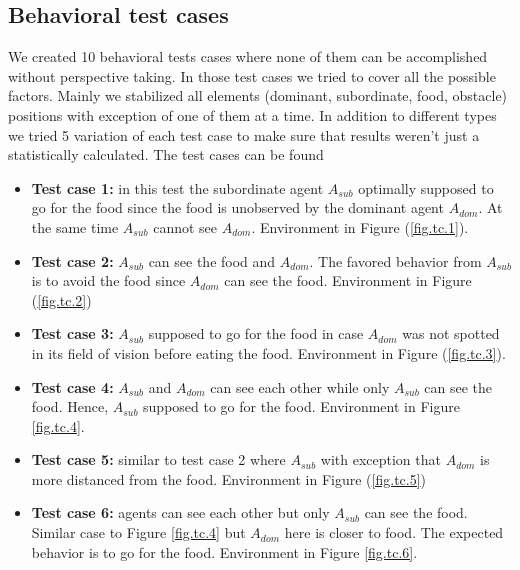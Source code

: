 \documentclass{article}
\begin{document}
\subsection{Behavioral test cases}\label{agents.behavior}
We created 10 behavioral tests cases where none of them can be accomplished without perspective taking. In those test cases we tried to cover all the possible factors. Mainly we stabilized all elements (dominant, subordinate, food, obstacle) positions with exception of one of them at a time.
In addition to different types we tried 5 variation of each test case to make sure that results weren't just a statistically calculated. The test cases can be found 

\begin{itemize}

\item \textbf {Test case 1:} in this test the subordinate agent \(A_{sub}\) optimally supposed to go for the food since the food is unobserved by the dominant agent \(A_{dom}\). At the same time \(A_{sub}\) cannot see \(A_{dom}\). Environment in Figure (\ref{fig.tc.1}).

\item \textbf {Test case 2:} \(A_{sub}\) can see the food and \(A_{dom}\). The favored behavior from \(A_{sub}\) is to avoid the food since \(A_{dom}\) can see the food. Environment in Figure (\ref{fig.tc.2})

\item \textbf {Test case 3:} \(A_{sub}\) supposed to go for the food in case \(A_{dom}\) was not spotted in its field of vision before eating the food. Environment in Figure (\ref{fig.tc.3}).

\item \textbf {Test case 4:} \(A_{sub}\) and \(A_{dom}\) can see each other while only \(A_{sub}\) can see the food. Hence, \(A_{sub}\) supposed to go for the food. Environment in Figure \ref{fig.tc.4}.

\item \textbf {Test case 5:} similar to test case 2 where \(A_{sub}\) with exception that \(A_{dom}\) is more distanced from the food. Environment in Figure (\ref{fig.tc.5})

\item \textbf {Test case 6:} agents can see each other but only \(A_{sub}\) can see the food. Similar case to Figure \ref{fig.tc.4} but \(A_{dom}\) here is closer to food. The expected behavior is to go for the food. Environment in Figure \ref{fig.tc.6}.


\end{itemize}
\end{document}
